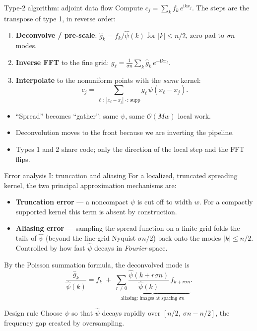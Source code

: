 \documentclass[aspectratio=169,11pt]{beamer}
\newcommand{\cO}{\mathcal{O}}
\newcommand{\ii}{\mathrm i}
\newcommand{\hl}[1]{{\color{CCMorange}\textbf{#1}}}
\begin{document}
\begin{frame}{Type-2 algorithm: adjoint data flow}
\small
Compute \(\displaystyle c_j=\sum_{k} f_k\, e^{\ii k x_j}\). The steps are the transpose of type 1, in reverse order:
\begin{enumerate}
  \item \hl{Deconvolve / pre-scale}: \(\widehat g_k = f_k/\widehat\psi(k)\) for \(|k|\le n/2\), zero-pad to \(\sigma n\) modes.
  \item \hl{Inverse FFT} to the fine grid: \(g_\ell = \tfrac{1}{\sigma n}\sum_k \widehat g_k\, e^{-\ii k x_\ell}\).
  \item \hl{Interpolate} to the nonuniform points with the \emph{same} kernel:
  \[
    c_j=\sum_{\ell\,:\,|x_\ell-x_j|<\text{supp}} g_\ell\,\psi(x_\ell-x_j).
  \]
\end{enumerate}
\vspace{1mm}
\begin{itemize}
  \item ``Spread'' becomes ``gather'': same $\psi$, same $\cO(Mw)$ local work.
  \item Deconvolution moves to the front because we are inverting the pipeline.
  \item Types 1 and 2 share code; only the direction of the local step and the FFT flips.
\end{itemize}
\end{frame}

\begin{frame}{Error analysis I: truncation and aliasing}
\footnotesize
For a localized, truncated spreading kernel, the two principal approximation mechanisms are:
\begin{itemize}
  \item \hl{Truncation error} --- a noncompact \(\psi\) is cut off to width \(w\). For a compactly supported kernel this term is absent by construction.
  \item \hl{Aliasing error} --- sampling the spread function on a finite grid folds the tails of \(\widehat\psi\) (beyond the fine-grid Nyquist \(\sigma n/2\)) back onto the modes \(|k|\le n/2\). Controlled by how fast \(\widehat\psi\) decays in \emph{Fourier} space.
\end{itemize}
\vspace{1mm}
By the Poisson summation formula, the deconvolved mode is
\[
  \frac{\widehat g_k}{\widehat\psi(k)}
  = f_k \;+\; \underbrace{\sum_{r\neq 0}\frac{\widehat\psi(k+r\sigma n)}{\widehat\psi(k)}\,f_{k+r\sigma n}}_{\text{aliasing: images at spacing }\sigma n}.
\]
\begin{block}{Design rule}
Choose \(\psi\) so that \(\widehat\psi\) decays rapidly over
\([n/2,\ \sigma n - n/2]\), the frequency gap created by oversampling.
\end{block}
\end{frame}
\end{document}
